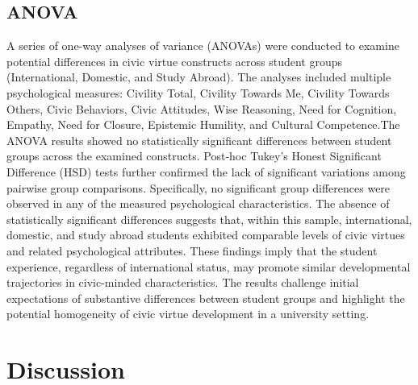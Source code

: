 \documentclass[
  man,
  floatsintext,
  longtable,
  nolmodern,
  notxfonts,
  notimes,
  colorlinks=true,linkcolor=blue,citecolor=blue,urlcolor=blue]{apa7}
\begin{document}
\subsection{ANOVA}\label{anova}

A series of one-way analyses of variance (ANOVAs) were conducted to
examine potential differences in civic virtue constructs across student
groups (International, Domestic, and Study Abroad). The analyses
included multiple psychological measures: Civility Total, Civility
Towards Me, Civility Towards Others, Civic Behaviors, Civic Attitudes,
Wise Reasoning, Need for Cognition, Empathy, Need for Closure, Epistemic
Humility, and Cultural Competence.The ANOVA results showed no
statistically significant differences between student groups across the
examined constructs. Post-hoc Tukey's Honest Significant Difference
(HSD) tests further confirmed the lack of significant variations among
pairwise group comparisons. Specifically, no significant group
differences were observed in any of the measured psychological
characteristics. The absence of statistically significant differences
suggests that, within this sample, international, domestic, and study
abroad students exhibited comparable levels of civic virtues and related
psychological attributes. These findings imply that the student
experience, regardless of international status, may promote similar
developmental trajectories in civic-minded characteristics. The results
challenge initial expectations of substantive differences between
student groups and highlight the potential homogeneity of civic virtue
development in a university setting.

\section{Discussion}\label{discussion}
\end{document}
